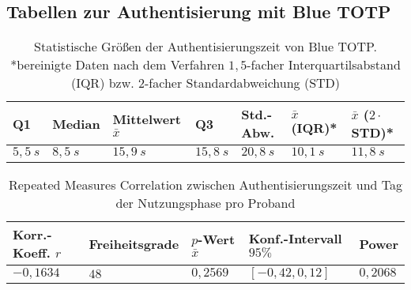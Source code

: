\subsection{Tabellen zur Authentisierung mit Blue TOTP}
\label{anh: studie ergebnisse auth}

\begin{table}
    \centering
    \begin{center}
    \begin{tabular}{| l | l | l | l | l || l | l |}
        \hline
        \textbf{Q1} & \textbf{Median} & \textbf{Mittelwert $\bar{x}$} & \textbf{Q3} & \textbf{Std.-Abw.} & \textbf{$\bar{x}$ (IQR)*} & \textbf{$\bar{x}$ ($2\cdot$ STD)*} \\
        \hline
        $5{,}5~s$ & $8{,}5~s$ & $15{,}9~s$ & $15{,}8~s$ & $20{,}8~s$ & $10{,}1~s$ & $11{,}8~s$ \\  
        \hline
    \end{tabular}
    \end{center}
    \caption[Statistische Größen der Authentisierungszeit von Blue TOTP]{Statistische Größen der Authentisierungszeit von Blue TOTP. *bereinigte Daten nach dem Verfahren $1{,}5$-facher Interquartilsabstand (IQR) bzw. $2$-facher Standardabweichung (STD)}
    \label{tab: studie ergebnisse auth time}
\end{table}

\begin{table}
    \centering
    \begin{center}
    \begin{tabular}{| l | l | l | l | l |}
        \hline
        \textbf{Korr.-Koeff. $r$} & \textbf{Freiheitsgrade} & \textbf{$p$-Wert $\bar{x}$} & \textbf{Konf.-Intervall $95\%$} & \textbf{Power}\\
        \hline
        $-0{,}1634$ & $48$ & $0{,}2569$ & $[-0{,}42, 0{,}12]$ & $0{,}2068$ \\  
        \hline
    \end{tabular}
    \end{center}
    \caption[Repeated Measures Correlation zur Authentisierungszeit]{Repeated Measures Correlation zwischen Authentisierungszeit und Tag der Nutzungsphase pro Proband}
    \label{tab: studie ergebnisse auth time rmcorr}
\end{table}